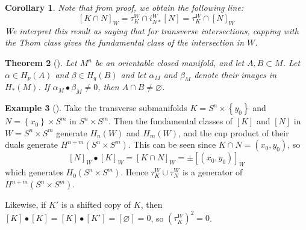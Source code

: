 \documentclass[reqno]{amsart}
\newtheorem{theorem}{Theorem}[section]
\newtheorem{corollary}[theorem]{Corollary}
\theoremstyle{definition}
\newtheorem{example}[theorem]{Example}
\theoremstyle{remark}
\begin{document}
      \begin{corollary}\label{Cor:DNIZKJ}
          Note that from proof, we obtain the following line:
          \[
          \left[ K \cap N \right]_W = 
          \tau_K^{W} \cap i_{N*}^{W} \left[ N \right] 
          = \tau_K^{W} \cap \left[ N \right]_W
          \] 
          We interpret this result as saying that for transverse intersections,
          capping with the Thom class gives the 
          fundamental class of the intersection in
          $W$.
      \end{corollary}

      





      \begin{theorem}[]\cite[VI, Theorem 11.10]{Bredon}
          Let $M^{n}$ be an orientable closed manifold, and let
          $A , B \subset M$. Let $\alpha \in H_p (A)$ and
          $\beta \in H_q (B)$ and let 
          $\alpha_M$ and $\beta_M$ denote their images in
          $H_* (M)$. If $\alpha_M \bullet \beta_M \neq 0$, then
          $A \cap B \neq \varnothing$.
      \end{theorem}



      \begin{example}[]
          Take the transverse submanifolds
          $K = S^{n} \times \left\{ y_0 \right\} $ and
          $N = \left\{ x_0 \right\} \times S^{m}$ in
          $S^{n} \times S^{m}$.
          Then the fundamental classes
          of $\left[ K \right] $ and $\left[ N \right] $ in
          $W = S^{n} \times S^{m}$ generate
          $H_n(W)$ and $H_m(W)$, and
           the cup product of their duals
           generate
           $H^{n+m}(S^{n} \times S^{m})$. This can be seen
           since
           $K \cap N = \left( x_0,y_0 \right) $, so
           \[
           \left[ N \right]_W \bullet \left[ K \right]_W 
           = \left[ K \cap N \right]_W =
           \pm \left[ \left( x_0,y_0 \right)  \right]_W
           \] 
           which generates
           $H_0 (S^{n} \times S^{m})$.
           Hence
           $\tau_K^{W} \cup \tau_N^{W}$ is a generator
           of $H^{n+m}(S^{n} \times S^{m})$.

           Likewise, if $K'$ is a shifted copy of $K$,
           then $\left[ K \right] \bullet
           \left[ K \right] = \left[ K \right] \bullet
           \left[ K' \right] = \left[ \varnothing \right] = 0$, so
           $\left( \tau_K^{W} \right)^2 = 0$.

      \end{example}
\end{document}
